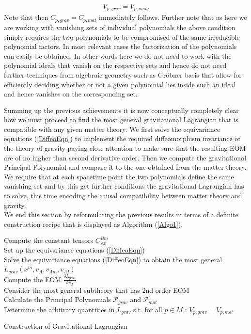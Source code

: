 \documentclass[a4paper,12pt, DIV=14, BCOR=5mm, twoside, headsepline, numbers=noenddot]{scrbook}
\begin{document}
\begin{align}
    V_{p,grav} = V_{p,mat}.
\end{align}
Note that then $C_{p,grav} = C_{p,mat}$ immediately follows. Further note that as  here we are working with vanishing sets of individual polynomials the above condition simply requires the two polynomials to be compromised of the same irreducible polynomial factors. In most relevant cases the factorization of the polynomials can easily be obtained. In other words here we do not need to work with the polynomial ideals that vanish on the respective sets and hence do not need further techniques from algebraic geometry such as Gröbner basis that allow for efficiently deciding whether or not a given polynomial lies inside such an ideal and hence vanishes on the corresponding set.  

Summing up the previous achievements it is now conceptually completely clear how we must proceed to find the most general gravitational Lagrangian that is compatible with any given matter theory. We first solve the equivariance equations (\ref{DiffeoEqn}) to implement the required diffeomorphism invariance of the theory of gravity paying close attention to make sure that the resulting EOM are of no higher than second derivative order. Then we compute the gravitational Principal Polynomial and compare it to the one obtained from the matter theory. We require that at each spacetime point the two polynomials define the same vanishing set and by this get further conditions the gravitational Lagrangian has to solve, this time encoding the causal compatibility between matter theory and gravity.\\

We end this section by reformulating the previous results in terms of a definite construction recipe that is displayed as Algorithm (\ref{Algo1}).
\begin{algorithm}[hbt!]
\SetAlgoLined
{}
Compute the constant tensors $C^{Bm}_{An}$ \\
Set up the equivariance equations (\ref{DiffeoEqn}) \\
Solve the equivariance equations (\ref{DiffeoEqn}) to obtain the most general $L_{grav}(x^m,v_A,v_{Am},v_{AI})$\\
Compute the EOM $\frac{\delta L_{grav}}{\delta v_A}$\\
Consider the most general subtheory that has 2nd order EOM\\
Calculate the Principal Polynomials $\mathcal{P}_{grav}$ and $\mathcal{P}_{mat}$\\
Determine the arbitrary quantities in $L_{grav}$ s.t. for all $p \in M$ : $V_{p,grav} = V_{p,mat}$
 \caption{Construction of Gravitational Lagrangian}\label{Algo1}
\end{algorithm}
\end{document}
